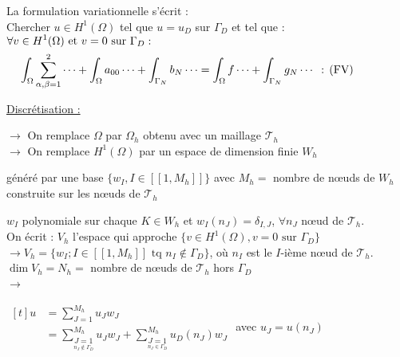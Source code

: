 \documentclass[12pt,a4paper]{article}
\begin{document}
\begin{sol}
\begin{enumerate}
			La formulation variationnelle s'écrit :\\
			Chercher $u \in H^1(\Omega)$ tel que $u = u_D$ sur $\Gamma_D$ et tel que :\\			
			
			$\begin{aligned}
				\forall v& \in H^1(\Omega) \text{ et } v=0 \text{ sur }\Gamma_D : \\
				& \displaystyle\int_\Omega \sum_{\alpha,\beta=1}^2 \cdots + \int_\Omega a_{00} \cdots + \int_{\Gamma_N} b_N \cdots = \int_\Omega f \cdots + \int_{\Gamma_N} g_N\cdots \hspace{.2cm} \text{: (FV)}
			\end{aligned}$
			
			\underline{Discrétisation :}\\
			\hspace*{.5cm} \begin{minipage}[t]{15cm}
				$\to$ On remplace $\Omega$ par $\Omega_h$ obtenu avec un maillage $\mathcal{T}_h$\\
				$\to$ On remplace $H^1(\Omega)$ par un espace de dimension finie $W_h$
				\hspace*{.5cm} \begin{minipage}[t]{14cm}
					généré par une base $\{w_I,I\in[\![1,M_h]\!]\}$ avec $M_h =$ nombre de nœuds de $W_h$\\
					construite sur les nœuds de $\mathcal T_h$
				\end{minipage}
				
				\vspace{.5cm}
				
				$w_I$ polynomiale sur chaque $K \in W_h$ et $w_I(n_J) = \delta_{I,J}$, $\forall n_J$ nœud de $\mathcal T_h$.\\
				
				On écrit : $V_h$ l'espace qui approche $\{v \in H^1(\Omega),v=0 \text{ sur }\Gamma_D\}$\\
				$\to V_h = \{w_I; I\in [\![1,M_h]\!] \text{ tq } n_I \not\in \Gamma_D\}$, où $n_I$ est le $I$-ième nœud de $\mathcal T_h$.\\
				$\dim V_h = N_h =$ nombre de nœuds de $\mathcal T_h$ hors $\Gamma_D$\\
				$\to$ \begin{minipage}[t]{18cm}
					$\begin{aligned}[t]
						u &= \displaystyle\sum_{J=1}^{M_h} u_Jw_J\\
						&= \sum_{\underset{n_J \not\in \Gamma_D}{J=1}}^{M_h} u_J w_J + \sum_{\underset{n_J \in \Gamma_D}{J=1}}^{M_h}u_D(n_J)w_J
					\end{aligned}$ avec $u_J = u(n_J)$
				\end{minipage}
				

\end{minipage}
\end{enumerate}
\end{sol}
\end{document}
